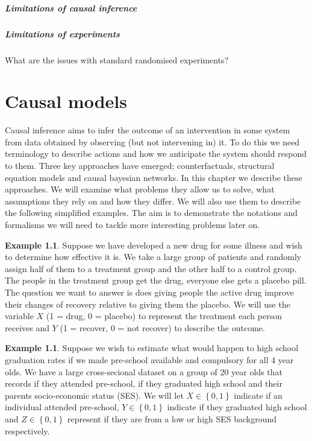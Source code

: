 \documentclass[11pt,a4paper,oneside]{book}
\newcommand{\set}[1]{\left\{#1\right\}}
\theoremstyle{plain}
\theoremstyle{definition}
\newtheorem{example}[theorem]{Example}
\begin{document}
\paragraph*{Limitations of causal inference}

\paragraph*{Limitations of experiments} What are the issues with standard randomised experiments?



\chapter{Causal models}
\label{chap:causal_models}

Causal inference aims to infer the outcome of an intervention in some system from data obtained by observing (but not intervening in) it. To do this we need terminology to describe actions and how we anticipate the system should respond to them. Three key approaches have emerged; counterfactuals, structural equation models and causal bayesian networks. In this chapter we describe these approaches. We will examine what problems they allow us to solve, what assumptions they rely on and how they differ. We will also use them to describe the following simplified examples. The aim is to demonstrate the notations and formalisms we will need to tackle more interesting problems later on.

\vspace*{.3cm}
\begin{example}
\label{exm:ranomized_experiment}
Suppose we have developed a new drug for some illness and wish to determine how effective it is. We take a large group of patients and randomly assign half of them to a treatment group and the other half to a control group. The people in the treatment group get the drug, everyone else gets a placebo pill. The question we want to answer is does giving people the active drug improve their changes of recovery relative to giving them the placebo. We will use the variable $X$ (1 = drug, 0 = placebo) to represent the treatment each person receives and $Y$ (1 = recover, 0 = not recover) to describe the outcome. 
\end{example}

\vspace*{.3cm}
\begin{example}
\label{exm:adjusting}
Suppose we wish to estimate what would happen to high school graduation rates if we made pre-school available and compulsory for all 4 year olds. We have a large cross-secional dataset on a group of 20 year olds that records if they attended pre-school, if they graduated high school and their parents socio-economic status (SES). We will let $X\in \set{0,1}$ indicate if an individual attended pre-school, $Y \in \set{0,1}$ indicate if they graduated high school and $Z \in \set{0,1}$ represent if they are from a low or high SES background respectively.  
\end{example}
\end{document}
